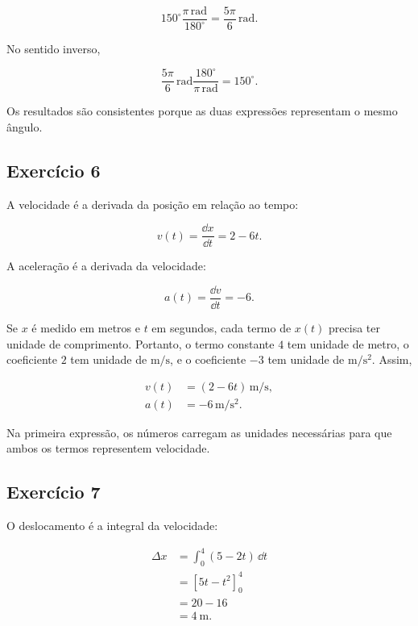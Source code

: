 \begin{equation}
  150^\circ\frac{\pi\,\si{\radian}}{180^\circ}
  =\boxed{\frac{5\pi}{6}\,\si{\radian}}.
\end{equation}

No sentido inverso,

\begin{equation}
  \frac{5\pi}{6}\,\si{\radian}
  \frac{180^\circ}{\pi\,\si{\radian}}
  =\boxed{150^\circ}.
\end{equation}

Os resultados são consistentes porque as duas expressões representam o mesmo ângulo.

\subsection*{Exercício 6}

A velocidade é a derivada da posição em relação ao tempo:

\begin{equation}
  v(t)=\frac{\dd x}{\dd t}=2-6t.
\end{equation}

A aceleração é a derivada da velocidade:

\begin{equation}
  a(t)=\frac{\dd v}{\dd t}=-6.
\end{equation}

Se \(x\) é medido em metros e \(t\) em segundos, cada termo de \(x(t)\) precisa ter unidade de comprimento. Portanto, o termo constante \(4\) tem unidade de metro, o coeficiente \(2\) tem unidade de \(\si{\meter\per\second}\), e o coeficiente \(-3\) tem unidade de \(\si{\meter\per\second\squared}\). Assim,

\begin{align}
  v(t)&=\boxed{(2-6t)\,\si{\meter\per\second}},\\
  a(t)&=\boxed{-6\,\si{\meter\per\second\squared}}.
\end{align}

Na primeira expressão, os números carregam as unidades necessárias para que ambos os termos representem velocidade.

\subsection*{Exercício 7}

O deslocamento é a integral da velocidade:

\begin{align}
  \Delta x
  &=\int_0^4(5-2t)\,\dd t\\
  &=\left[5t-t^2\right]_0^4\\
  &=20-16\\
  &=\boxed{\SI{4}{\meter}}.
\end{align}

